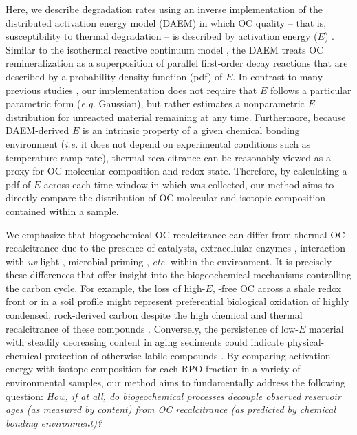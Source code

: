 Here, we describe degradation rates using an inverse implementation of the distributed activation energy model (DAEM) in which OC quality -- that is, susceptibility to thermal degradation -- is described by activation energy ($E$) \citep{Braun:1987vf,Burnham:1987ut,Cramer:2004tg}. Similar to the isothermal reactive continuum model \citep{Boudreau:1991wf,Forney:2012dr,Forney:2012hz}, the DAEM treats OC remineralization as a superposition of parallel first-order decay reactions that are described by a probability density function (pdf) of $E$. In contrast to many previous studies \citep[\textit{e.g.}][]{Lakshmanan:1994vs,Cai:2007hh,deCaprariis:2012jk}, our implementation does not require that $E$ follows a particular parametric form (\textit{e.g.} Gaussian), but rather estimates a nonparametric $E$ distribution for unreacted material remaining at any time. Furthermore, because DAEM-derived $E$ is an intrinsic property of a given chemical bonding environment (\textit{i.e.} it does not depend on experimental conditions such as temperature ramp rate), thermal recalcitrance can be reasonably viewed as a proxy for OC molecular composition and redox state. Therefore, by calculating a pdf of $E$ across each time window in which  was collected, our method aims to directly compare the distribution of OC molecular and isotopic composition contained within a sample.

We emphasize that biogeochemical OC recalcitrance can differ from thermal OC recalcitrance due to the presence of catalysts, extracellular enzymes \citep{Sinsabaugh:2008il,Arnosti:2011iv}, interaction with \textit{uv} light \citep{Spencer:2009vl}, microbial priming \citep{Bianchi:2011cu}, \textit{etc.} within the environment. It is precisely these differences that offer insight into the biogeochemical mechanisms controlling the carbon cycle. For example, the loss of high-$E$, -free OC across a shale redox front or in a soil profile might represent preferential biological oxidation of highly condensed, rock-derived carbon despite the high chemical and thermal recalcitrance of these compounds \citep{Petsch:2001eq,Rethemeyer:2004cy,Marschner:2008eo}. Conversely, the persistence of low-$E$ material with steadily decreasing  content in aging sediments could indicate physical-chemical protection of otherwise labile compounds \citep{Mayer:1994wn,Rothman:2007jq}. By comparing activation energy with isotope composition for each RPO fraction in a variety of environmental samples, our method aims to fundamentally address the following question: \textit{How, if at all, do biogeochemical processes decouple observed reservoir ages (as measured by  content) from OC recalcitrance (as predicted by chemical bonding environment)?}

